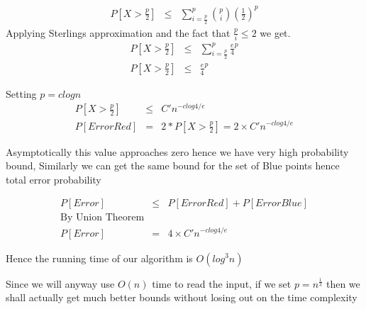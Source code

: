 \documentclass{assignment}
\begin{document}
\begin{problemlist}
\begin{problem}
\begin{answer}
\begin{eqnarray}
P[X > \frac{p}{2} ] & \leq & \sum_{i=\frac{p}{2}}^{p} \binom{p}{i} \left( \frac{1}{2} \right) ^p
\end{eqnarray}
Applying Sterlings approximation and the fact that $\frac{p}{i} \leq 2$ we get. 
\begin{eqnarray}
P[X > \frac{p}{2} ] & \leq & \sum_{i=\frac{p}{2}}^{p} \frac{e}{4} ^p \\
P[X > \frac{p}{2} ] & \leq & \frac{e}{4} ^p
\end{eqnarray}

Setting $p=clogn$
\begin{eqnarray}
P[X > \frac{p}{2} ] & \leq &  C'  n ^ {-c log 4/e} \\
P[Error Red] & = & 2 * P[X > \frac{p}{2} ] = 2 \times  C'  n ^ {-c log 4/e} 
\end{eqnarray}

Asymptotically this value approaches zero hence we have very high probability bound, 
Similarly we can get the same bound for the set of Blue points hence total error probability 


\begin{eqnarray}
P[Error] & \leq & P[Error Red] + P[Error Blue] \\
\textrm{By Union Theorem} & & \nonumber \\
P[Error] &  = & 4 \times C'  n^{-c log 4/e} 
\end{eqnarray}

Hence the running time of our algorithm is $O(log^3 n)$

Since we will anyway use $O(n)$ time to read the input, if we set $p= n^{\frac{1}{3}}$ then we shall actually get much better bounds without losing out on the time complexity


\end{answer}

\end{problem}

\end{problemlist}
\end{document}
